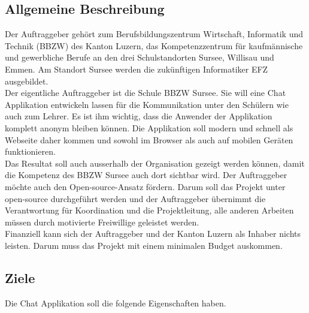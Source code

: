 \documentclass[12pt]{article}
\begin{document}
    \subsection{Allgemeine Beschreibung}
        Der Auftraggeber gehört zum Berufsbildungszentrum Wirtschaft, Informatik und Technik (BBZW) des Kanton Luzern, das Kompetenzzentrum für kaufmännische und gewerbliche Berufe an den drei Schulstandorten Sursee, Willisau und Emmen. Am Standort Sursee werden die zukünftigen Informatiker EFZ ausgebildet. \\
        Der eigentliche Auftraggeber ist  die Schule BBZW Sursee. Sie will eine Chat Applikation entwickeln lassen für die Kommunikation unter den Schülern wie auch zum Lehrer. Es ist ihm wichtig, dass die Anwender der Applikation komplett anonym bleiben können. Die Applikation soll modern und schnell als Webseite daher kommen und sowohl im Browser als auch auf mobilen Geräten funktionieren. \\
        Das Resultat soll auch ausserhalb der Organisation gezeigt werden können, damit die Kompetenz des BBZW Sursee auch dort sichtbar wird.
        Der Auftraggeber möchte auch den Open-source-Ansatz fördern. Darum soll das Projekt unter open-source durchgeführt werden und der Auftraggeber übernimmt die Verantwortung für Koordination und die Projektleitung, alle anderen Arbeiten müssen durch motivierte Freiwillige geleistet werden. \\
        Finanziell kann sich der Auftraggeber und der Kanton Luzern als Inhaber nichts leisten. Darum muss das Projekt mit einem minimalen Budget auskommen.

    \subsection{Ziele}
      Die Chat Applikation soll die folgende Eigenschaften haben.
\end{document}
